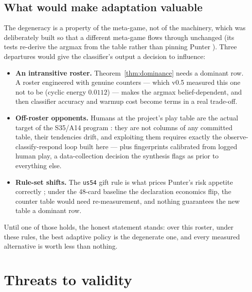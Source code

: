 \documentclass[11pt]{article}
\newcommand{\code}[1]{\texttt{#1}}
\newcommand{\usff}{\code{us54}}
\begin{document}
\subsection{What would make adaptation valuable}
\label{sec:valuable}

The degeneracy is a property of the meta-game, not of the machinery, which was
deliberately built so that a different meta-game flows through unchanged (its tests
re-derive the argmax from the table rather than pinning Punter \cite{repo}). Three
departures would give the classifier's output a decision to influence:

\begin{itemize}
\item \textbf{An intransitive roster.} Theorem~\ref{thm:dominance} needs a dominant row.
  A roster engineered with genuine counters --- which v0.5 measured this one not to be
  (cyclic energy $0.0112$) \cite{v05paper} --- makes the argmax belief-dependent, and then
  classifier accuracy and warmup cost become terms in a real trade-off.
\item \textbf{Off-roster opponents.} Humans at the project's play table are the actual
  target of the S35/A14 program \cite{playstyles}: they are not columns of any committed
  table, their tendencies drift, and exploiting them requires exactly the
  observe-classify-respond loop built here --- plus fingerprints calibrated from logged
  human play, a data-collection decision the synthesis flags as prior to everything else.
\item \textbf{Rule-set shifts.} The \usff{} gift rule is what prices Punter's risk
  appetite correctly \cite{v05paper}; under the 48-card baseline the declaration economics
  flip, the counter table would need re-measurement, and nothing guarantees the new table
  a dominant row.
\end{itemize}

Until one of those holds, the honest statement stands: over this roster, under these
rules, the best adaptive policy is the degenerate one, and every measured alternative is
worth less than nothing.

\section{Threats to validity}
\label{sec:threats}
\end{document}
